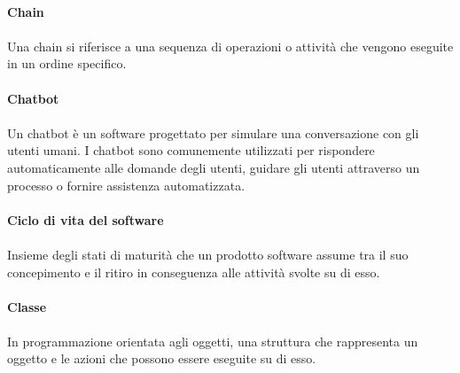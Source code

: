 \documentclass[10pt, a4paper]{article}
\begin{document}
\vspace{2em}
\paragraph{Chain}\noindent\hrulefill
\paragraph{}Una chain si riferisce a una sequenza di operazioni o attività che vengono eseguite in un ordine specifico.

\vspace{2em}
\paragraph{Chatbot}\noindent\hrulefill
\paragraph{}Un chatbot è un software progettato per simulare una conversazione con gli utenti umani. I chatbot sono comunemente utilizzati per rispondere automaticamente alle domande degli utenti, guidare gli utenti attraverso un processo o fornire assistenza automatizzata.

\vspace{2em}
\paragraph{Ciclo di vita del software}\noindent\hrulefill\noindent\hrulefill
\paragraph{}Insieme degli stati di maturità che un prodotto software assume tra il suo concepimento e il ritiro in conseguenza alle
attività svolte su di esso.

\vspace{2em}
\paragraph{Classe}\noindent\hrulefill
\paragraph{}In programmazione orientata agli oggetti, una struttura che rappresenta un oggetto e le azioni che possono essere eseguite su di esso.


\vspace{2em}
\end{document}
